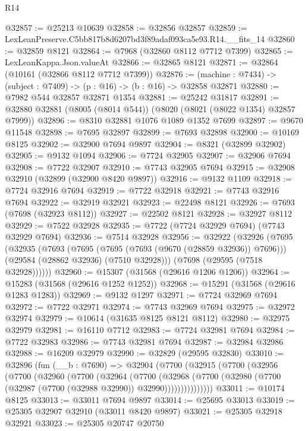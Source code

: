 \begin{lexlean}{R14}
\begin{coremodule}
@32857 := @25213 @10639
@32858 := @32856 @32857
@32859 := LexLeanPreserve.C5bb817b8d6207bd3f89adaf093ca5e93.R14.__fits_14
@32860 := @32859 @8121
@32864 := @7968 (@32860 @8112 @7712 @7399)
@32865 := LexLeanKappa.Json.valueAt
@32866 := @32865 @8121
@32871 := @32864 (@10161 (@32866 @8112 @7712 @7399))
@32876 := (machine : @7434) -> (subject : @7409) -> (p : @16) -> (b : @16) -> @32858 @32871
@32880 := @7982 @544 @32857 @32871 @1354
@32881 := @25242 @31817
@32891 := @32880 @32881 (@8005 (@8014 @544)) (@8020 (@8021 (@8022 @1354) @32857 @7999))
@32896 := @8310 @32881 @1076 @1089 @1352 @7699
@32897 := @9670 @11548
@32898 := @7695 @32897
@32899 := @7693 @32898
@32900 := @10169 @8125
@32902 := @32900 @7694 @9897
@32904 := @8321 (@32899 @32902)
@32905 := @9132 @1094
@32906 := @7724 @32905
@32907 := @32906 @7694
@32908 := @7722 @32907
@32910 := @7743 @32905 @7694
@32915 := @32908 @32910 (@32899 (@32900 @8420 @9897))
@32916 := @9132 @1109
@32918 := @7724 @32916 @7694
@32919 := @7722 @32918
@32921 := @7743 @32916 @7694
@32922 := @32919 @32921
@32923 := @22498 @8121
@32926 := @7693 (@7698 (@32923 @8112))
@32927 := @22502 @8121
@32928 := @32927 @8112
@32929 := @7522 @32928
@32935 := @7722 (@7724 @32929 @7694) (@7743 @32929 @7694)
@32936 := @7514 @32928
@32956 := @32922
    (@32926
      (@7695
        (@32935
          (@7693
            (@7695 (@7695 (@7693 (@9670 (@28859 @32936)) @7696)))
            (@29584 (@28862 @32936) (@7510 @32928)))
          (@7698 (@29595 (@7518 @32928))))))
@32960 := @15307 (@31568 (@29616 @1206 @1206))
@32964 := @15283 (@31568 (@29616 @1252 @1252))
@32968 := @15291 (@31568 (@29616 @1283 @1283))
@32969 := @9132 @1297
@32971 := @7724 @32969 @7694
@32972 := @7722 @32971
@32974 := @7743 @32969 @7694
@32975 := @32972 @32974
@32979 := @10614 (@31635 @8125 @8121 @8112)
@32980 := @32975 @32979
@32981 := @16110 @7712
@32983 := @7724 @32981 @7694
@32984 := @7722 @32983
@32986 := @7743 @32981 @7694
@32987 := @32984 @32986
@32988 := @16209 @32979
@32990 := @32829 (@29595 @32830)
@33010 := @32896
    (fun (__b : @7690) =>
    @32904
      (@7700
        (@32915
          (@7700
            (@32956
              (@7700
                (@32960
                  (@7700
                    (@32964
                      (@7700
                        (@32968
                          (@7700
                            (@32980 (@7700 (@32987 (@7700 (@32988 @32990)) @32990)))))))))))))))
@33011 := @10174 @8125
@33013 := @33011 @7694 @9897
@33014 := @25695 @33013
@33019 := @25305 @32907 @32910 (@33011 @8420 @9897)
@33021 := @25305 @32918 @32921
@33023 := @25305 @20747 @20750

\end{coremodule}
\end{lexlean}
